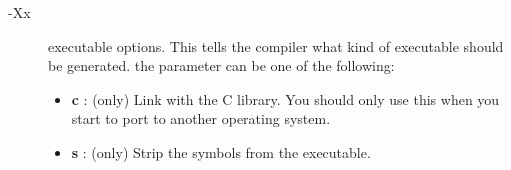 \documentclass{report}
\newcommand{\olabel}[1]{\label{option:#1}}
\begin{document}
\begin{description}
\item [-Xx] \olabel{X} executable options. This tells the compiler what
kind of \linux executable should be generated. the parameter 
can be one of the following:
\begin{itemize}
\item \textbf{c} : (\linux only) Link with the C library. You should only use this when
you start to port \fpc to another operating system.
\item \textbf{s} : (\dos only) Strip the symbols from the executable.
\end{itemize}
\end{description}

%
%

\end{document}
